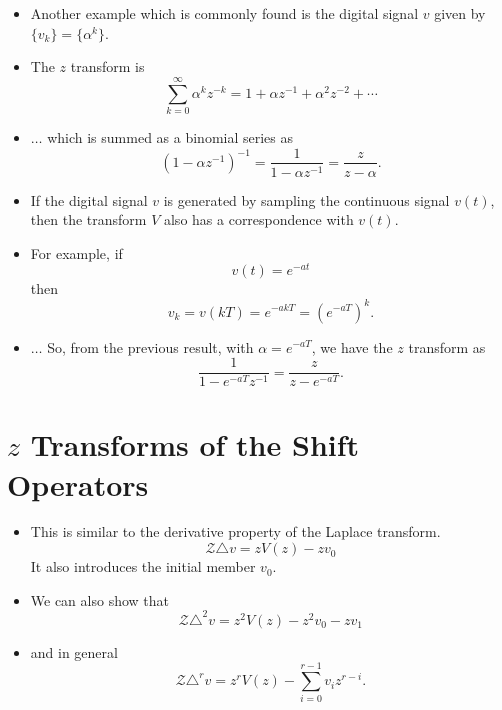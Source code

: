 \begin{slide}\label{slide:l8s1b}

\begin{itemize}

\item Another example which is commonly found is the digital signal $v$
given by $\{v_k\} = \{\alpha^k\}$. 

\item The $z$ transform is
\[\sum_{k=0}^{\infty} \alpha^{k} z^{-k} = 1 + \alpha z^{-1} + \alpha^2
z^{-2}+\cdots\] 

\item $\ldots$ which is summed as a binomial series as
\[(1-\alpha z^{-1})^{-1} = \frac{1}{1-\alpha
  z^{-1}} = \frac{z}{z-\alpha}.\]

\end{itemize}

\end{slide}

\begin{slide}\label{slide:l8s1c}

\begin{itemize}

\item If the digital signal $v$ is generated by sampling the continuous
signal $v(t)$, then the transform $V$ also has a correspondence
with $v(t)$. 

\item For example, if \[v(t) = e^{-at}\] then \[v_k = v(kT)
= e^{-akT} = (e^{-aT})^k.\] 

\item $\ldots$ So, from the previous result, with
$\alpha=e^{-aT}$, we have the $z$ transform as
\[\frac{1}{1-e^{-aT}z^{-1}}=\frac{z}{z-e^{-aT}}.\]

\end{itemize}

\end{slide}

\section*{$z$ Transforms of the Shift Operators}

\begin{slide}\label{slide:l8s2}

\begin{itemize}
\item  This is similar to the derivative property of the Laplace
  transform.
 \[\mathcal{Z}\triangle v = z V(z) - zv_0\] It also introduces the initial member $v_0$.

\item  We can also show that
  \[\mathcal{Z}\triangle^2 v = z^2 V(z) - z^2 v_0 - z v_1\]
\item and in general
  \[\mathcal{Z}\triangle^r v = z^r V(z) - \sum_{i=0}^{r-1} v_i z^{r-i}.\]

\end{itemize}

\end{slide}

